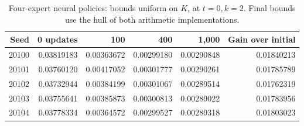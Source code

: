 \begin{table}[htbp]\centering
\caption{Four-expert neural policies: bounds uniform on $K$, at $t=0,k=2$. Final bounds use the hull of both arithmetic implementations.}
\label{tab:r21-policy}
\begin{tabular}{rrrrrr}\toprule
Seed & 0 updates & 100 & 400 & 1,000 & Gain over initial \\ \midrule
20100 & 0.03819183 & 0.00363672 & 0.00299180 & 0.00290848 & 0.01840213 \\
20101 & 0.03760120 & 0.00417052 & 0.00301777 & 0.00290261 & 0.01785789 \\
20102 & 0.03732944 & 0.00384199 & 0.00301067 & 0.00289514 & 0.01762319 \\
20103 & 0.03755641 & 0.00385873 & 0.00300813 & 0.00289022 & 0.01783956 \\
20104 & 0.03778334 & 0.00364572 & 0.00299527 & 0.00289318 & 0.01803023 \\
\bottomrule\end{tabular}
\end{table}
